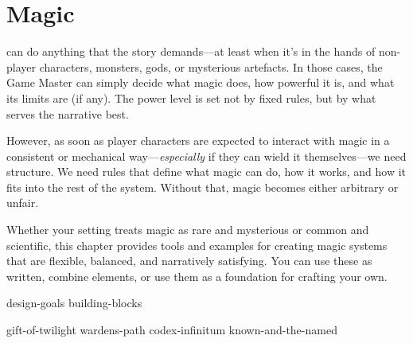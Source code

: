 \chapter{Magic}

 can do anything that the story demands—at least when it’s in the hands of non-player characters, monsters, gods, or mysterious artefacts. In those cases, the Game Master can simply decide what magic does, how powerful it is, and what its limits are (if any). The power level is set not by fixed rules, but by what serves the narrative best.

However, as soon as player characters are expected to interact with magic in a consistent or mechanical way—\emph{especially} if they can wield it themselves—we need structure. We need rules that define what magic can do, how it works, and how it fits into the rest of the system. Without that, magic becomes either arbitrary or unfair.

Whether your setting treats magic as rare and mysterious or common and scientific, this chapter provides tools and examples for creating magic systems that are flexible, balanced, and narratively satisfying. You can use these as written, combine elements, or use them as a foundation for crafting your own.

{design-goals}
{building-blocks}

{gift-of-twilight}
{wardens-path}
{codex-infinitum}
{known-and-the-named}





